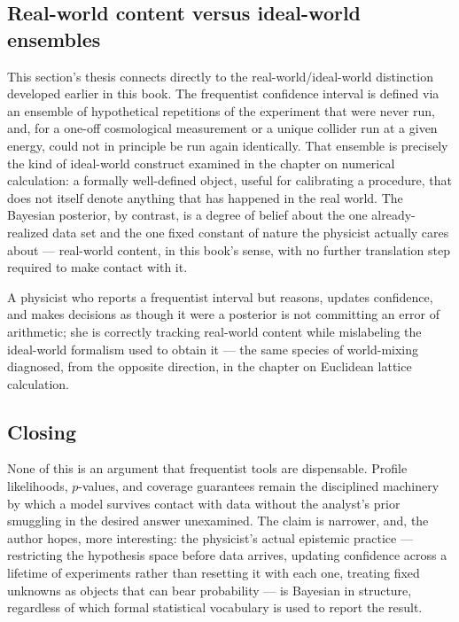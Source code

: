 \subsection{Real-world content versus ideal-world ensembles}

This section's thesis connects directly to the real-world/ideal-world
distinction developed earlier in this book. The frequentist confidence interval
is defined via an ensemble of hypothetical repetitions of the experiment that
were never run, and, for a one-off cosmological measurement or a unique
collider run at a given energy, could not in principle be run again
identically. That ensemble is precisely the kind of ideal-world construct
examined in the chapter on numerical calculation: a formally well-defined
object, useful for calibrating a procedure, that does not itself denote
anything that has happened in the real world. The Bayesian posterior, by
contrast, is a degree of belief about the one already-realized data set and the
one fixed constant of nature the physicist actually cares about --- real-world
content, in this book's sense, with no further translation step required to
make contact with it.

\begin{corollary}
A physicist who reports a frequentist interval but reasons, updates confidence,
    and makes decisions as though it were a posterior is not committing an
    error of arithmetic; she is correctly tracking real-world content while
    mislabeling the ideal-world formalism used to obtain it --- the same
    species of world-mixing diagnosed, from the opposite direction, in the
    chapter on Euclidean lattice calculation.
\end{corollary}

\subsection{Closing}

None of this is an argument that frequentist tools are dispensable. Profile
likelihoods, $p$-values, and coverage guarantees remain the disciplined
machinery by which a model survives contact with data without the analyst's
prior smuggling in the desired answer unexamined. The claim is narrower, and,
the author hopes, more interesting: the physicist's actual epistemic practice
--- restricting the hypothesis space before data arrives, updating confidence
across a lifetime of experiments rather than resetting it with each one,
treating fixed unknowns as objects that can bear probability --- is Bayesian in
structure, regardless of which formal statistical vocabulary is used to report
the result.

